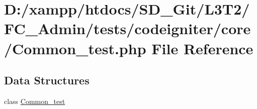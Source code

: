\hypertarget{_admin_2tests_2codeigniter_2core_2_common__test_8php}{}\section{D\+:/xampp/htdocs/\+S\+D\+\_\+\+Git/\+L3\+T2/\+F\+C\+\_\+\+Admin/tests/codeigniter/core/\+Common\+\_\+test.php File Reference}
\label{_admin_2tests_2codeigniter_2core_2_common__test_8php}
\subsection*{Data Structures}
\begin{DoxyCompactItemize}
\item 
class \hyperlink{class_common__test}{Common\+\_\+test}
\end{DoxyCompactItemize}
